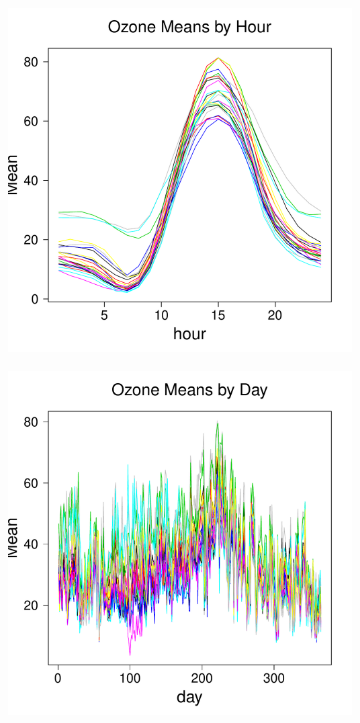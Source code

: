 \documentclass[alpha-refs]{wiley-article}
\begin{document}
\begin{figure}[H]
  \begin{center}
   \begin{subfigure}[b]{.3\textwidth}
      \includegraphics[width=\textwidth]{hour_mean_O3.pdf}
      \label{fig:hour_mean_ozone}
   \end{subfigure}
              \begin{subfigure}[b]{.3\textwidth}
      \includegraphics[width=\textwidth]{day_mean_O3}

\end{subfigure}
\end{center}
\end{figure}
\end{document}
